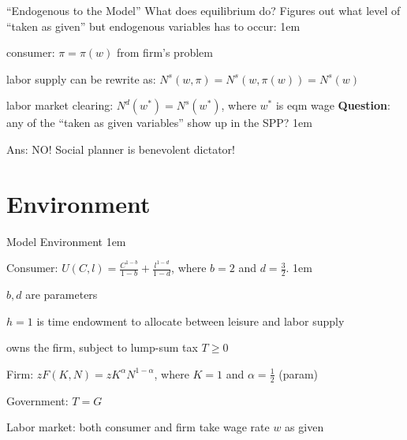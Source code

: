\documentclass[11pt,aspectratio=43]{beamer}
\let\olditemize=\itemize
\let\endolditemize=\enditemize
\renewenvironment{itemize}{\olditemize \itemsep1em}{\endolditemize}
\theoremstyle{definition}
\begin{document}
\begin{frame}{``Endogenous to the Model''}
\label{slide:__Endogenous_to_the_Model__}
    What does equilibrium do? Figures out what level of ``taken as given'' but endogenous variables has to occur:
    \begin{itemize}
        \item consumer: $ \pi = \pi( w ) $ from firm's problem
        \item labor supply can be rewrite as: $ N^{s} ( w, \pi ) = N^{s}( w, \pi( w ) ) = N^{s}( w )$
        \item labor market clearing: $ N^{d}( w^{*} ) = N^{s}( w^{*} ) $, where $ w^{*} $ is eqm wage
    \end{itemize}
    \textbf{Question}: any of the ``taken as given variables'' show up in the SPP?
    \begin{itemize}
        \item Ans: NO! Social planner is \alert{benevolent dictator}!
    \end{itemize}
\end{frame}

\section{Environment}
\label{sec:Environment}

\begin{frame}{Model Environment}
\label{slide:Model_Environment}
    \begin{itemize}
        \item Consumer: $ U( C, l ) = \frac{C^{1-b}}{1-b} + \frac{l^{1-d}}{1-d} $, where $ b=2 $ and $ d = \frac{3}{2} $.
        \begin{itemize}
            \item $ b, d $ are \alert{parameters}
            \item $ h = 1 $ is time endowment to allocate between leisure and labor supply
            \item owns the firm, subject to lump-sum tax $ T \ge  0 $
        \end{itemize}
        \item Firm: $ z F( K, N ) = z K^{\alpha} N^{1-\alpha} $, where $ K = 1 $ and $ \alpha = \frac{1}{2} $ (param)
        \item Government: $ T = G $
        \item Labor market: both consumer and firm take wage rate $ w $ as given
    \end{itemize}
\end{frame}
\end{document}
